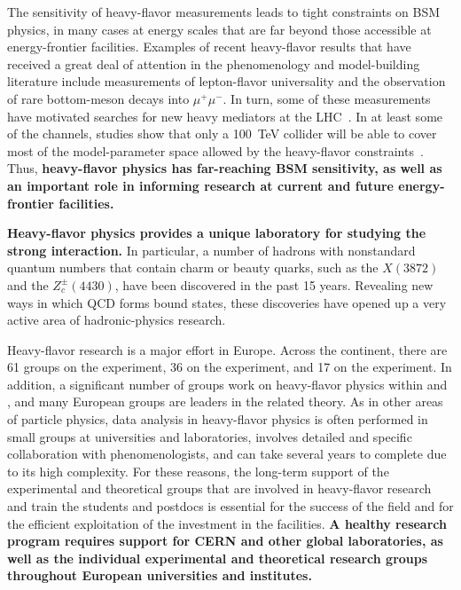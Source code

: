 \documentclass[12pt,a4paper]{article}
\begin{document}
The sensitivity of heavy-flavor measurements leads to tight constraints on
BSM physics, in many cases at energy scales that are far beyond
those accessible at energy-frontier facilities. Examples of recent heavy-flavor results that have received a great deal of attention in the phenomenology and model-building literature include measurements of lepton-flavor universality
and the observation of rare bottom-meson decays into $\mu^+\mu^-$. In turn, some of these measurements have motivated searches for new heavy mediators at the LHC~\cite{Sirunyan:2018kzh, *Sirunyan:2018jdk}. In at least some of the channels, studies show that only a 100~TeV collider will be able to cover most of the  model-parameter space allowed by the heavy-flavor constraints~\cite{Allanach:2017bta}.
Thus, \textbf{heavy-flavor
physics has far-reaching BSM sensitivity, as well as an important role 
in informing research at current and future energy-frontier facilities.} 

\textbf{Heavy-flavor physics provides a unique laboratory for studying the
strong interaction.} In particular, a number of hadrons
with nonstandard quantum numbers that contain charm or beauty quarks, such as the $X(3872)$ and the $Z_c^\pm(4430)$, 
have been discovered in the past 15 years. Revealing new ways in which QCD forms bound states, these discoveries have opened up a very active area of hadronic-physics research.

Heavy-flavor research is a major effort in Europe.
Across the continent, there are 61 groups on the \lhcb experiment, 36 on the
\belletwo experiment, and 17 on the \besiii experiment. In addition,
a significant number of groups work on heavy-flavor physics within  \atlas and
    \cms, and many European groups are leaders in the related theory.
As in other areas of particle physics, data analysis in heavy-flavor physics is 
often performed in small groups at universities and laboratories, involves detailed and specific collaboration with phenomenologists, and can 
take several years to complete due to its high complexity. For these reasons,
the long-term support of the experimental and theoretical groups that are involved in 
heavy-flavor research and train the students and postdocs is essential for the success of the field and for the efficient exploitation of the investment in the facilities. 
\textbf{A healthy research program requires support for CERN and 
other global laboratories, 
as well as the individual experimental and theoretical research
groups throughout European universities and institutes.}
\end{document}
